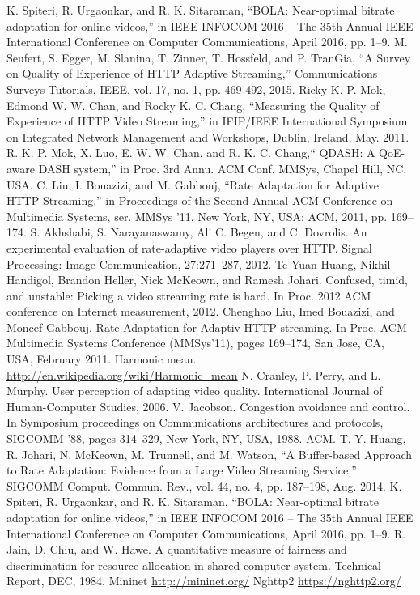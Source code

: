 \documentclass[journal]{IEEEtran}
\begin{document}
\begin{thebibliography}{1}
K. Spiteri, R. Urgaonkar, and R. K. Sitaraman, “BOLA: Near-optimal
bitrate adaptation for online videos,” in IEEE INFOCOM 2016 – The
35th Annual IEEE International Conference on Computer Communications, April 2016, pp. 1–9.
M. Seufert, S. Egger, M. Slanina, T. Zinner, T. Hossfeld,
and P. TranGia, “A Survey on Quality of Experience of
HTTP Adaptive Streaming,” Communications Surveys Tutorials, IEEE, vol. 17, no. 1, pp. 469-492, 2015.
Ricky K. P. Mok, Edmond W. W. Chan, and Rocky K. C. Chang,
“Measuring the Quality of Experience of HTTP Video Streaming,” in
IFIP/IEEE International Symposium on Integrated Network Management and Workshops, Dublin, Ireland, May. 2011.
 R. K. P. Mok, X. Luo, E. W. W. Chan, and R. K. C.
Chang,“ QDASH: A QoE-aware DASH system,” in Proc.
3rd Annu. ACM Conf. MMSys, Chapel Hill, NC, USA. 
  C. Liu, I. Bouazizi, and M. Gabbouj, “Rate Adaptation for
Adaptive HTTP Streaming,” in Proceedings of the Second Annual
ACM Conference on Multimedia Systems, ser. MMSys ’11. New
York, NY, USA: ACM, 2011, pp. 169–174.
 S. Akhshabi, S. Narayanaswamy, Ali C. Begen, and C. Dovrolis. An
experimental evaluation of rate-adaptive video players over HTTP.
Signal Processing: Image Communication, 27:271–287, 2012.
 Te-Yuan Huang, Nikhil Handigol, Brandon Heller, Nick McKeown,
and Ramesh Johari. Confused, timid, and unstable: Picking a video
streaming rate is hard. In Proc. 2012 ACM conference on Internet
measurement, 2012.
  Chenghao Liu, Imed Bouazizi, and Moncef Gabbouj. Rate Adaptation
for Adaptiv HTTP streaming. In Proc. ACM Multimedia Systems
Conference (MMSys’11), pages 169–174, San Jose, CA, USA, February
2011.
 Harmonic mean.
\url{http://en.wikipedia.org/wiki/Harmonic_mean}
 N. Cranley, P. Perry, and L. Murphy. User perception of adapting video quality.
International Journal of Human-Computer Studies, 2006.
V. Jacobson. Congestion avoidance and control. In Symposium proceedings on Communications architectures and protocols, SIGCOMM ’88,
pages 314–329, New York, NY, USA, 1988. ACM.
T.-Y. Huang, R. Johari, N. McKeown, M. Trunnell, and M. Watson,
“A Buffer-based Approach to Rate Adaptation: Evidence from a
Large Video Streaming Service,” SIGCOMM Comput. Commun.
Rev., vol. 44, no. 4, pp. 187–198, Aug. 2014.
K. Spiteri, R. Urgaonkar, and R. K. Sitaraman, “BOLA: Near-optimal
bitrate adaptation for online videos,” in IEEE INFOCOM 2016 – The
35th Annual IEEE International Conference on Computer Communications, April 2016, pp. 1–9.
R. Jain, D. Chiu, and W. Hawe. A quantitative measure of fairness and
discrimination for resource allocation in shared computer system. Technical
Report, DEC, 1984.
 Mininet \url{http://mininet.org/}
 Nghttp2 \url{https://nghttp2.org/}
\end{thebibliography}
\end{document}
